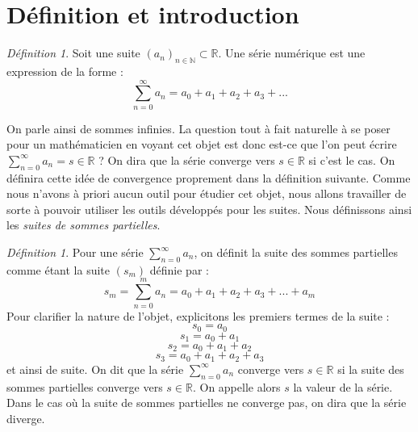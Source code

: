 \documentclass[oneside,12pt,french,table]{book}
\theoremstyle{definition}
\theoremstyle{plain}
\theoremstyle{remark}
\newtheorem{defi}[definition]{Définition}
\newcommand{\Nn}{{\mathbb{N}}}
\newcommand{\Rr}{{\mathbb{R}}}
\begin{document}
\section{Définition et introduction}
\begin{defi}
    Soit une suite $(a_n)_{n \in \Nn } \subset \Rr$. Une série numérique est une expression de la forme : 
    $$ \sum_{n=0}^{\infty} a_n = a_0 + a_1 + a_2 + a_3 + ... $$
 \end{defi}    
On parle ainsi de sommes infinies. La question tout à fait naturelle à se poser pour un mathématicien en voyant cet objet est donc est-ce que l'on peut écrire $\sum_{n=0}^{\infty} a_n = s \in \Rr $ ? On dira que la série converge vers $s \in \Rr$ si c'est le cas. On définira cette idée de convergence proprement dans la définition suivante.
\newline 
Comme nous n'avons à priori aucun outil pour étudier cet objet, nous allons travailler de sorte à pouvoir utiliser les outils développés pour les suites. Nous définissons ainsi les \textit{suites de sommes partielles}. 
\begin{defi}
    Pour une série  $ \sum_{n=0}^{\infty} a_n$, on définit la suite des sommes partielles comme étant la suite $(s_m)$ définie par : $$ s_m = \sum_{n=0}^m  a_n = a_0 + a_1 + a_2 + a_3 + ... + a_m $$
    Pour clarifier la nature de l'objet, explicitons les premiers termes de la suite :
    $$ s_0 = a_0$$
    $$ s_1 = a_0 + a_1$$
    $$ s_2 = a_0 + a_1 + a_2$$
    $$ s_3 = a_0 + a_1 + a_2 + a_3$$
    et ainsi de suite.
    On dit que la série  $ \sum_{n=0}^{\infty} a_n$ converge vers  $ s\in \Rr$ si la suite des sommes partielles converge vers $s \in \Rr$. On appelle alors $s$ la valeur de la série. Dans le cas où la suite de sommes partielles ne converge pas, on dira que la série diverge. 
\end{defi}
\end{document}
